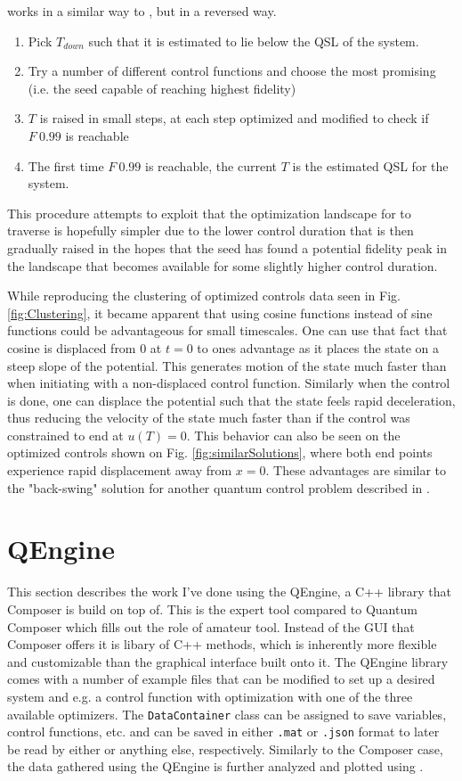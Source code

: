 \documentclass[a4paper, twocolumn]{revtex4-1}
\begin{document}
 works in a similar way to , but in a reversed way.
\begin{enumerate}
	\item Pick $T_{down}$ such that it is estimated to lie below the QSL of the system.
	\item Try a number of different control functions and choose the most promising (i.e. the seed capable of reaching highest fidelity)
	\item $T$ is raised in small steps, at each step optimized and modified to check if $F~0.99$ is reachable
	\item The first time $F~0.99$ is reachable, the current $T$ is the estimated QSL for the system.
\end{enumerate}
This procedure attempts to exploit that the optimization landscape for  to traverse is hopefully simpler due to the lower control duration that is then gradually raised in the hopes that the seed has found a potential fidelity peak in the landscape that becomes available for some slightly higher control duration.

While reproducing the clustering of optimized controls data seen in Fig. \ref{fig:Clustering}, it became apparent that using cosine functions instead of sine functions could be advantageous for small timescales. One can use that fact that cosine is displaced from 0 at $t=0$ to ones advantage as it places the state on a steep slope of the potential. This generates motion of the state much faster than when initiating with a non-displaced control function. Similarly when the control is done, one can displace the potential such that the state feels rapid deceleration, thus reducing the velocity of the state much faster than if the control was constrained to end at $u(T)=0$. This behavior can also be seen on the optimized controls shown on Fig. \ref{fig:similarSolutions}, where both end points experience rapid displacement away from $x=0$. These advantages are similar to the "back-swing" solution for another quantum control problem described in \cite{QM2Paper}.

\section{QEngine}\label{sec:QEngine}
This section describes the work I've done using the QEngine, a C++ library that Composer is build on top of. This is the expert tool compared to Quantum Composer which fills out the role of amateur tool. Instead of the GUI that Composer offers it is libary of C++ methods, which is inherently more flexible and customizable than the graphical interface built onto it. The QEngine library comes with a number of example files that can be modified to set up a desired system and e.g. a control function with optimization with one of the three available optimizers. The \texttt{DataContainer} class can be assigned to save variables, control functions, etc. and can be saved in either \texttt{.mat} or \texttt{.json} format to later be read by either  or anything else, respectively. Similarly to the Composer case, the data gathered using the QEngine is further analyzed and plotted using . \\
\end{document}
